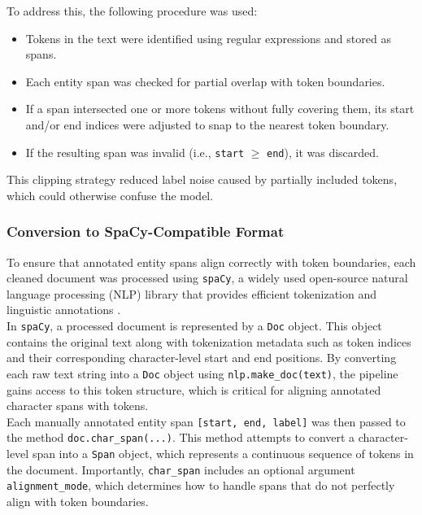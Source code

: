 \documentclass{article}
\begin{document}
To address this, the following procedure was used:
\begin{itemize}
    \item Tokens in the text were identified using regular expressions and stored as spans.
    \item Each entity span was checked for partial overlap with token boundaries.
    \item If a span intersected one or more tokens without fully covering them, its start and/or end indices were adjusted to snap to the nearest token boundary.
    \item If the resulting span was invalid (i.e., \texttt{start} $\geq$ \texttt{end}), it was discarded.
\end{itemize}

This clipping strategy reduced label noise caused by partially included tokens, which could otherwise confuse the model.

\subsubsection{Conversion to SpaCy-Compatible Format}

To ensure that annotated entity spans align correctly with token boundaries, each cleaned document was processed using \texttt{spaCy}, a widely used open-source natural language processing (NLP) library that provides efficient tokenization and linguistic annotations \cite{spacy}. \\

In \texttt{spaCy}, a processed document is represented by a \texttt{Doc} object. This object contains the original text along with tokenization metadata such as token indices and their corresponding character-level start and end positions. By converting each raw text string into a \texttt{Doc} object using \texttt{nlp.make\_doc(text)}, the pipeline gains access to this token structure, which is critical for aligning annotated character spans with tokens. \\

Each manually annotated entity span \texttt{[start, end, label]} was then passed to the method \texttt{doc.char\_span(...)}. This method attempts to convert a character-level span into a \texttt{Span} object, which represents a continuous sequence of tokens in the document. Importantly, \texttt{char\_span} includes an optional argument \texttt{alignment\_mode}, which determines how to handle spans that do not perfectly align with token boundaries. \\
\end{document}
